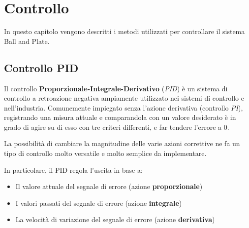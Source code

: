 \chapter{Controllo}
\label{chapter:controllo}

In questo capitolo vengono descritti i metodi utilizzati per controllare il sistema Ball and Plate.

\section{Controllo PID}

Il controllo \textbf{Proporzionale-Integrale-Derivativo} (\textit{PID}) è un sistema di controllo a retroazione negativa ampiamente utilizzato nei sistemi di controllo e nell'industria. Comunemente impiegato senza l'azione derivativa (controllo \textit{PI}), registrando una misura attuale e comparandola con un valore desiderato è in grado di agire su di esso con tre criteri differenti, e far tendere l'errore a 0.

La possibilità di cambiare la magnitudine delle varie azioni correttive ne fa un tipo di controllo molto versatile e molto semplice da implementare.
\bigskip

In particolare, il PID regola l'uscita in base a:
\begin{itemize}[noitemsep]
	\item Il valore attuale del segnale di errore (azione \textbf{proporzionale})
	\item I valori passati del segnale di errore (azione \textbf{integrale})
	\item La velocità di variazione del segnale di errore (azione \textbf{derivativa})
\end{itemize}


